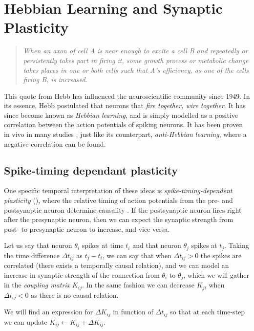 \newpage
\section{Hebbian Learning and Synaptic Plasticity} \label{sec:HebbianLearningAndSynapticPlasticity}
\vspace{1mm}
\begin{quote}
\textsl{When an axon of cell A is near enough to excite a cell B and repeatedly or persistently takes part in firing it, some growth process or metabolic change takes places in one or both cells such that A's efficiency, as one of the cells firing B, is increased.}\cite{Hebb1949}
\end{quote}

This quote from Hebb has influenced the neuroscientific community since 1949. In its essence, Hebb postulated that neurons that \textsl{fire together, wire together}. It has since become known as \textsl{Hebbian learning}, and is simply modelled as a positive correlation between the action potentials of spiking neurons. It has been proven in vivo in many studies \cite{ChrolCannon2014}, just like its counterpart, \textsl{anti-Hebbian learning}, where a negative correlation can be found.


\subsection{Spike-timing dependant plasticity}
One specific temporal interpretation of these ideas is \textsl{spike-timing-dependent plasticity} (\STDP), where the relative timing of action potentials from the pre- and postsynaptic neuron determine causality \cite{Kempter1999, Gerstner2002}. If the postsynaptic neuron fires right after the presynaptic neuron, then we can expect the synaptic strength from post- to presynaptic neuron to increase, and vice versa. 

Let us say that neuron $\theta_i$ spikes at time $t_i$ and that neuron $\theta_j$ spikes at $t_j$. Taking the time difference $\Delta t_{ij}$ as $t_j - t_i$, we can say that when $\Delta t_{ij} > 0$ the spikes are correlated (there exists a temporally causal relation), and we can model an increase in synaptic strength of the connection from $\theta_i$ to $\theta_j$, which we will gather in the \textsl{coupling matrix} $K_{ij}$. In the same fashion we can decrease $K_{ji}$ when $\Delta t_{ij} < 0$ as there is no causal relation. 

We will find an expression for $\Delta K_{ij}$ in function of $\Delta t_{ij}$ so that at each time-step we can update $K_{ij} \leftarrow K_{ij} + \Delta K_{ij}$.\\

